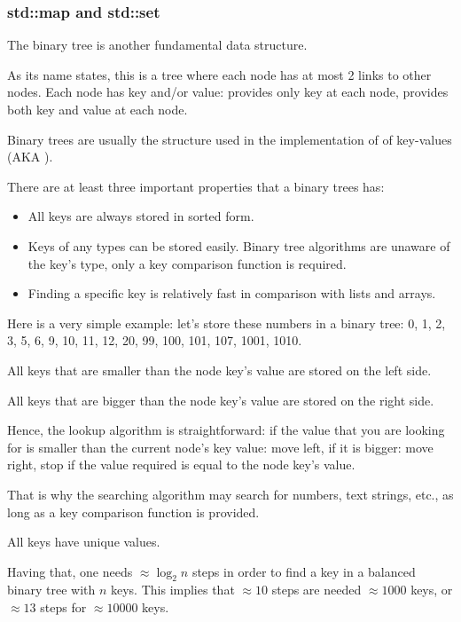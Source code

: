 \subsubsection{std::map and std::set}

The binary tree is another fundamental data structure.

As its name states, this is a tree where each node has at most 2 links to other nodes.
Each node has key and/or value:
 provides only key at each node,
 provides both key and value at each node.

Binary trees are usually the structure used in the implementation of  of key-values (\ac{AKA} ).

There are at least three important properties that a binary trees has:
\begin{itemize}
\item All keys are always stored in sorted form.
\item Keys of any types can be stored easily.
Binary tree algorithms are unaware of the key's type, 
only a key comparison function is required.
\item 
Finding a specific key is relatively fast in comparison with lists and arrays.
\end{itemize}

Here is a very simple example: let's store these numbers in a binary tree:
0, 1, 2, 3, 5, 6, 9, 10, 11, 12, 20, 99, 100, 101, 107, 1001, 1010.



All keys that are smaller than the node key's value are stored on the left side.

All keys that are bigger than the node key's value are stored on the right side.

Hence, the lookup algorithm is straightforward: if the value that you are looking for is smaller than the current node's key value:
move left, if it is bigger: move right, stop if the value required is equal to the node key's value.

That is why the searching algorithm may search for numbers, text strings, etc., as long as 
a key comparison function is provided.

All keys have unique values.

Having that, one needs $\approx \log_{2} n$ steps in order to find a key in a balanced binary tree with $n$ keys.
This implies that $\approx 10$ steps are needed $\approx 1000$ keys, or $\approx 13$ 
steps for $\approx 10000$ keys.

